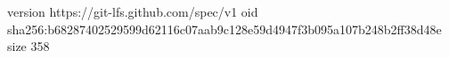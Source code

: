 version https://git-lfs.github.com/spec/v1
oid sha256:b68287402529599d62116c07aab9c128e59d4947f3b095a107b248b2ff38d48e
size 358
